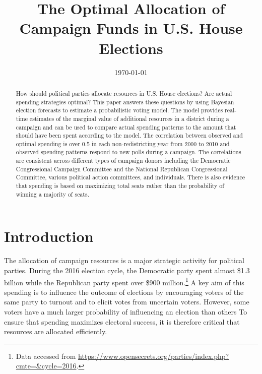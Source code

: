 \documentclass[12pt,final,fleqn]{article}
\theoremstyle{plain}
\begin{document}
\title{\textbf{The Optimal Allocation of Campaign Funds in U.S. House Elections}}
\date{\today}
\maketitle

\thispagestyle{empty}
\setcounter{page}{0}

\begin{singlespacing}
\begin{abstract}
How should political parties allocate resources in U.S. House elections? Are actual spending strategies optimal? This paper answers these questions by using Bayesian election forecasts to estimate a probabilistic voting model. The model provides real-time estimates of the marginal value of additional resources in a district during a campaign and can be used to compare actual spending patterns to the amount that should have been spent according to the model. The correlation between observed and optimal spending is over $0.5$ in each non-redistricting year from 2000 to 2010 and observed spending patterns respond to new polls during a campaign. The correlations are consistent across different types of campaign donors including the Democratic Congressional Campaign Committee and the National Republican Congressional Committee, various political action committees, and individuals. There is also evidence that spending is based on maximizing total seats rather than the probability of winning a majority of seats.
\end{abstract}
\end{singlespacing}

\clearpage
\doublespacing

\section{Introduction}
The allocation of campaign resources is a major strategic activity for political parties. During the 2016 election cycle, the Democratic party spent almost \$1.3 billion while the Republican party spent over \$900 million.\footnote{Data accessed from \url{https://www.opensecrets.org/parties/index.php?cmte=&cycle=2016}.} A key aim of this spending is to influence the outcome of elections by encouraging voters of the same party to turnout and to elicit votes from uncertain voters. However, some voters have a much larger probability of influencing an election than others \citep{chamberlain1981note, gelman2004standard, gelman2012probability} To ensure that spending maximizes electoral success, it is therefore critical that resources are allocated efficiently. 
\end{document}
